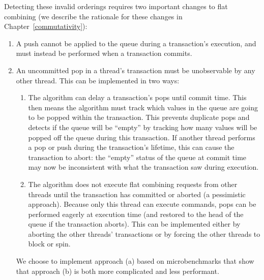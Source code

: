 Detecting these invalid orderings requires two important changes to flat combining (we describe the rationale for these changes in Chapter~\ref{commutativity}): 
\begin{enumerate}
\item A push cannot be applied to the queue during a transaction's execution, and must instead be performed when a transaction commits.
\item An uncommitted pop in a thread's transaction must be unobservable by any other thread. This can be implemented in two ways:  
    \begin{enumerate}
        \item The algorithm can delay a transaction's pops until commit time. This then means the algorithm must track which values in the queue are going to be popped within the transaction. This prevents duplicate pops and detects if the queue will be ``empty'' by tracking how many values will be popped off the queue during this transaction. If another thread performs a pop or push during the transaction's lifetime, this can cause the transaction to abort: the ``empty'' status of the queue at commit time may now be inconsistent with what the transaction saw during execution. 
        \item The algorithm does not execute flat combining requests from other threads until the transaction has committed or aborted (a pessimistic approach). Because only this thread can execute commands, pops can be performed eagerly at execution time (and restored to the head of the queue if the transaction aborts). This can be implemented either by aborting the other threads' transactions or by forcing the other threads to block or spin.
    \end{enumerate}

        We choose to implement approach (a) based on microbenchmarks that show that approach (b) is both more complicated and less performant.
\end{enumerate}


